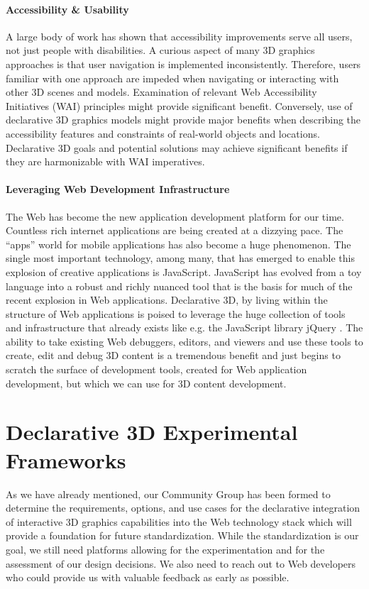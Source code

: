 \documentclass[review]{acmsiggraph}
\begin{document}
\paragraph{Accessibility \& Usability}
A large body of work has shown that accessibility improvements serve all users, not just people with disabilities.  A curious aspect of many 3D graphics approaches is that user navigation is implemented inconsistently.  Therefore, users familiar with one approach are impeded when navigating or interacting with other 3D scenes and models.  Examination of relevant Web Accessibility Initiatives (WAI) principles might provide significant benefit.  Conversely, use of declarative 3D graphics models might provide major benefits when describing the accessibility features and constraints of real-world objects and locations.  Declarative 3D goals and potential solutions may achieve significant benefits if they are harmonizable with WAI imperatives.

\paragraph{Leveraging Web Development Infrastructure}
The Web has become the new application development platform for our time. Countless rich internet applications are being created at a dizzying pace. The ``apps'' world for mobile applications has also become a huge phenomenon. The single most important technology, among many, that has emerged to enable this explosion of creative applications is JavaScript. JavaScript has evolved from a toy language into a robust and richly nuanced tool that is the basis for much of the recent explosion in Web applications.
Declarative 3D, by living within the structure of Web applications is poised to leverage the huge collection of tools and infrastructure that already exists like e.g. the JavaScript library jQuery \cite{jquery}. The ability to take existing Web debuggers, editors, and viewers and use these tools to create, edit and debug 3D content is a tremendous benefit and just begins to scratch the surface of development tools, created for Web application development, but which we can use for 3D content development.



\section{Declarative 3D Experimental Frameworks}
\label{sec:Frameworks}

As we have already mentioned, our Community Group has been formed to determine the requirements, options, and use cases for the declarative integration of interactive 3D graphics capabilities into the Web technology stack which will provide a foundation for future standardization.
While the standardization is our goal, we still need platforms allowing for the experimentation and for the assessment of our design decisions. We also need to reach out to Web developers who could provide us with valuable feedback as early as possible.
\end{document}
